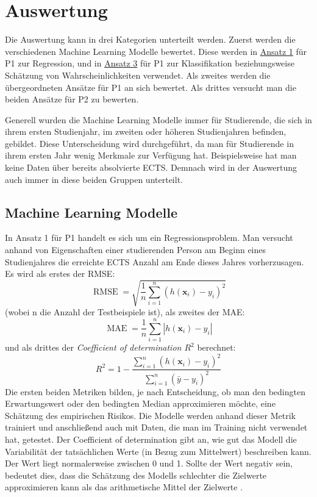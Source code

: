 

\section{Auswertung}
\label{sec:auswertung}
Die Auswertung kann in drei Kategorien unterteilt werden. Zuerst werden die verschiedenen Machine Learning Modelle bewertet.
Diese werden in \hyperref[sec:appr1]{Ansatz 1} f\"ur P1 zur Regression, und in \hyperref[sec:appr2]{Ansatz 3} f\"ur P1 zur Klassifikation
beziehungsweise Sch\"atzung von Wahrscheinlichkeiten verwendet.
Als zweites werden die \"ubergeordneten Ans\"atze f\"ur P1 an sich bewertet.
Als drittes versucht man die beiden Ans\"atze f\"ur P2 zu bewerten.

Generell wurden die Machine Learning Modelle immer f\"ur Studierende, die sich in ihrem ersten Studienjahr, im
zweiten oder h\"oheren Studienjahren befinden, gebildet. Diese Unterscheidung wird durchgef\"uhrt, da man f\"ur Studierende in ihrem ersten Jahr
wenig Merkmale zur Verf\"ugung hat. Beispielsweise hat man keine Daten \"uber bereits absolvierte ECTS. Demnach wird in der Auswertung
auch immer in diese beiden Gruppen unterteilt.

\subsection{Machine Learning Modelle}
In Ansatz 1 f\"ur P1 handelt es sich um ein Regressionsproblem. Man versucht anhand von Eigenschaften einer studierenden Person am Beginn eines Studienjahres
die erreichte ECTS Anzahl am Ende dieses Jahres vorherzusagen. Es wird als erstes der
\gls{RMSE}:
$$ \operatorname{RMSE} = \sqrt{\frac{1}{n}\sum_{i = 1}^{n}(h(\mathbf{x}_i)-y_i)^2} $$
(wobei n die Anzahl der Testbeispiele ist), als zweites der \gls{MAE}:
$$ \operatorname{MAE} = \frac{1}{n}\sum_{i = 1}^{n}|h(\mathbf{x}_i) - y_i| $$
und als drittes der \textit{Coefficient of determination $R^2$} berechnet:
$$ R^2 = 1 - \frac{\sum_{i = 1}^{n}(h(\mathbf{x}_i) - y_i)^2}{\sum_{i=1}^n(\bar{y}-y_i)^2} $$
Die ersten beiden Metriken bilden, je nach Entscheidung, ob man den bedingten Erwartungswert oder den bedingten Median
approximieren m\"ochte, eine Sch\"atzung des empirischen Risikos. Die Modelle werden anhand dieser Metrik trainiert und anschlie{\ss}end
auch mit Daten, die man im Training nicht verwendet hat, getestet. Der Coefficient of determination gibt an, wie gut das Modell
die Variabilit\"at der tats\"achlichen Werte (in Bezug zum Mittelwert) beschreiben kann. Der Wert liegt normalerweise zwischen 0 und 1. Sollte der Wert negativ sein,
bedeutet dies, dass die Sch\"atzung des Modells schlechter die Zielwerte approximieren kann als das arithmetische Mittel der Zielwerte \cite[Seiten 317 bis 319]{guttag}.


